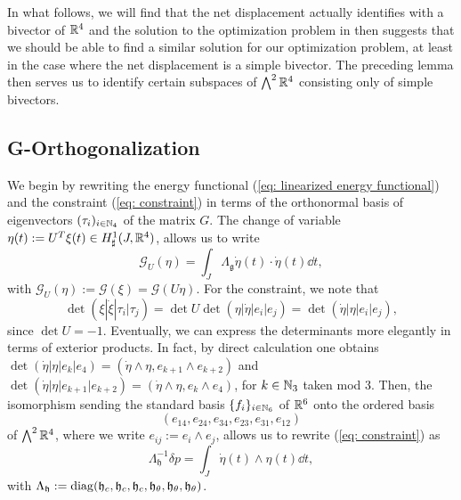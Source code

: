 In what follows, we will find that the net displacement actually identifies with a bivector of $\mathbb{R}^4$ and the solution to the optimization problem in \cite{Alouges2017} then suggests that we should be able to find a similar solution for our optimization problem, at least in the case where the net displacement is a simple bivector. The preceding lemma then serves us to identify certain subspaces of $\bigwedge^2 \mathbb{R}^4$ consisting only of simple bivectors.

\subsection{G-Orthogonalization}
We begin by rewriting the energy functional (\ref{eq: linearized energy functional}) and the constraint (\ref{eq: constraint}) in terms of the orthonormal basis of eigenvectors $(\tau_i)_{i \in \mathbb{N}_4}$ of the matrix $G$. The change of variable $\eta(t) := U^T \xi(t) \in H_{\sharp}^{1}(J, \mathbb{R}^4)$, allows us to write
\begin{equation}
\label{eq: G-orth energy functional}
\mathcal{G}_{U}(\eta) = \int_{J} \Lambda_{\mathfrak{g}} \dot{\eta}(t) \cdot \dot{\eta}(t) \dd t,
\end{equation}
with $\mathcal{G}_{U}(\eta) := \mathcal{G}(\xi) = \mathcal{G}(U \eta)$. For the constraint, we note that
\begin{equation}
\det(\xi |\dot{\xi} | \tau_i | \tau_j) =  \det U \det (\eta | \dot{\eta} | e_i | e_j) = \det(\dot{\eta} | \eta | e_i |e_j),
\end{equation}
since $\det U = -1$. Eventually, we can express the determinants more elegantly in terms of exterior products. In fact, by direct calculation one obtains $\det(\dot{\eta} | \eta | e_k |e_4) = (\dot{\eta} \wedge \eta, e_{k + 1} \wedge e_{k+2})$ and $\det(\dot{\eta} |\eta | e_{k + 1} |e_{k + 2}) = (\dot{\eta} \wedge \eta, e_k \wedge e_4)$, for $k \in \mathbb{N}_3$ taken mod 3. Then, the isomorphism sending the standard basis $\{f_i\}_{i \in \mathbb{N}_6}$ of $\mathbb{R}^6$ onto the ordered basis 
\begin{equation}
\label{eq: basis of bivectors}
(e_{14}, e_{24}, e_{34}, e_{23}, e_{31}, e_{12})
\end{equation}
of $\bigwedge^2 \mathbb{R}^4$, where we write $e_{ij} := e_i \wedge e_j$, allows us to rewrite (\ref{eq: constraint}) as
\begin{equation}
\label{eq: G-orth constraint}
\Lambda_{\mathfrak{h}}^{-1} \delta p = \int_{J} \dot{\eta}(t) \wedge\eta(t) \dd t,
\end{equation}
with $\Lambda_{\mathfrak{h}} := \operatorname{diag}(\mathfrak{h}_{c}, \mathfrak{h}_{c}, \mathfrak{h}_{c}, \mathfrak{h}_{\theta}, \mathfrak{h}_{\theta}, \mathfrak{h}_{\theta})$.

